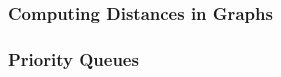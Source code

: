 \subsubsection{Computing Distances in Graphs}

\subsubsection{Priority Queues}





































\endinput

BEGIN OLD STUFF...



